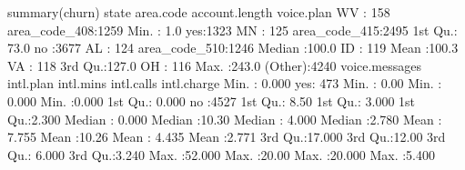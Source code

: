 \documentclass[
  11pt,
]{book}
\makeatletter
\newenvironment{Shaded}{}{}
\newcommand{\DecValTok}[1]{#1}
\newcommand{\FloatTok}[1]{#1}
\newcommand{\FunctionTok}[1]{#1}
\newcommand{\NormalTok}[1]{#1}
\newcommand{\SpecialCharTok}[1]{\textcolor[rgb]{0.39,0.39,0.39}{#1}}
\newenvironment{kframe}{%
\medskip{}
\setlength{\fboxsep}{.8em}
 \def\at@end@of@kframe{}%
 \ifinner\ifhmode%
  \def\at@end@of@kframe{\end{minipage}}%
  \begin{minipage}{\columnwidth}%
 \fi\fi%
 \def\FrameCommand##1{\hskip\@totalleftmargin \hskip-\fboxsep
 \colorbox{shadecolor}{##1}\hskip-\fboxsep
     \hskip-\linewidth \hskip-\@totalleftmargin \hskip\columnwidth}%
 \MakeFramed {\advance\hsize-\width
   \@totalleftmargin\z@ \linewidth\hsize
   \@setminipage}}%
 {\par\unskip\endMakeFramed%
 \at@end@of@kframe}
\renewenvironment{Shaded}{\begin{kframe}}{\end{kframe}}
\theoremstyle{definition}
\theoremstyle{definition}
\theoremstyle{definition}
\theoremstyle{definition}
\theoremstyle{remark}
\makeatother
\begin{document}
\begin{Shaded}
\begin{Highlighting}[]
\FunctionTok{summary}\NormalTok{(churn)}
\NormalTok{        state              area.code    account.length  voice.plan}
\NormalTok{    WV     }\SpecialCharTok{:} \DecValTok{158}\NormalTok{   area\_code\_408}\SpecialCharTok{:}\DecValTok{1259}\NormalTok{   Min.   }\SpecialCharTok{:}  \FloatTok{1.0}\NormalTok{   yes}\SpecialCharTok{:}\DecValTok{1323}  
\NormalTok{    MN     }\SpecialCharTok{:} \DecValTok{125}\NormalTok{   area\_code\_415}\SpecialCharTok{:}\DecValTok{2495}   \DecValTok{1}\NormalTok{st Qu.}\SpecialCharTok{:} \FloatTok{73.0}\NormalTok{   no }\SpecialCharTok{:}\DecValTok{3677}  
\NormalTok{    AL     }\SpecialCharTok{:} \DecValTok{124}\NormalTok{   area\_code\_510}\SpecialCharTok{:}\DecValTok{1246}\NormalTok{   Median }\SpecialCharTok{:}\FloatTok{100.0}             
\NormalTok{    ID     }\SpecialCharTok{:} \DecValTok{119}\NormalTok{                        Mean   }\SpecialCharTok{:}\FloatTok{100.3}             
\NormalTok{    VA     }\SpecialCharTok{:} \DecValTok{118}                        \DecValTok{3}\NormalTok{rd Qu.}\SpecialCharTok{:}\FloatTok{127.0}             
\NormalTok{    OH     }\SpecialCharTok{:} \DecValTok{116}\NormalTok{                        Max.   }\SpecialCharTok{:}\FloatTok{243.0}             
\NormalTok{    (Other)}\SpecialCharTok{:}\DecValTok{4240}                                                  
\NormalTok{    voice.messages   intl.plan    intl.mins       intl.calls      intl.charge   }
\NormalTok{    Min.   }\SpecialCharTok{:} \FloatTok{0.000}\NormalTok{   yes}\SpecialCharTok{:} \DecValTok{473}\NormalTok{   Min.   }\SpecialCharTok{:} \FloatTok{0.00}\NormalTok{   Min.   }\SpecialCharTok{:} \FloatTok{0.000}\NormalTok{   Min.   }\SpecialCharTok{:}\FloatTok{0.000}  
    \DecValTok{1}\NormalTok{st Qu.}\SpecialCharTok{:} \FloatTok{0.000}\NormalTok{   no }\SpecialCharTok{:}\DecValTok{4527}   \DecValTok{1}\NormalTok{st Qu.}\SpecialCharTok{:} \FloatTok{8.50}   \DecValTok{1}\NormalTok{st Qu.}\SpecialCharTok{:} \FloatTok{3.000}   \DecValTok{1}\NormalTok{st Qu.}\SpecialCharTok{:}\FloatTok{2.300}  
\NormalTok{    Median }\SpecialCharTok{:} \FloatTok{0.000}\NormalTok{              Median }\SpecialCharTok{:}\FloatTok{10.30}\NormalTok{   Median }\SpecialCharTok{:} \FloatTok{4.000}\NormalTok{   Median }\SpecialCharTok{:}\FloatTok{2.780}  
\NormalTok{    Mean   }\SpecialCharTok{:} \FloatTok{7.755}\NormalTok{              Mean   }\SpecialCharTok{:}\FloatTok{10.26}\NormalTok{   Mean   }\SpecialCharTok{:} \FloatTok{4.435}\NormalTok{   Mean   }\SpecialCharTok{:}\FloatTok{2.771}  
    \DecValTok{3}\NormalTok{rd Qu.}\SpecialCharTok{:}\FloatTok{17.000}              \DecValTok{3}\NormalTok{rd Qu.}\SpecialCharTok{:}\FloatTok{12.00}   \DecValTok{3}\NormalTok{rd Qu.}\SpecialCharTok{:} \FloatTok{6.000}   \DecValTok{3}\NormalTok{rd Qu.}\SpecialCharTok{:}\FloatTok{3.240}  
\NormalTok{    Max.   }\SpecialCharTok{:}\FloatTok{52.000}\NormalTok{              Max.   }\SpecialCharTok{:}\FloatTok{20.00}\NormalTok{   Max.   }\SpecialCharTok{:}\FloatTok{20.000}\NormalTok{   Max.   }\SpecialCharTok{:}\FloatTok{5.400}  
                                                                                

\end{Highlighting}
\end{Shaded}
\end{document}
